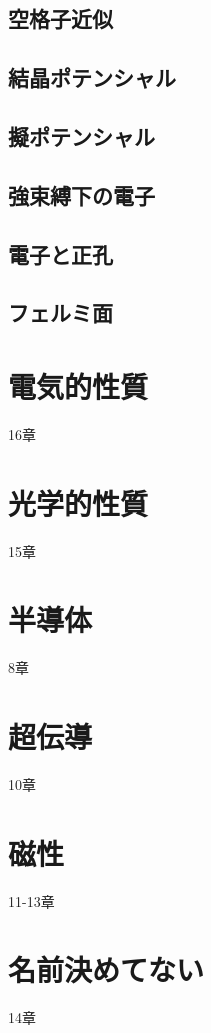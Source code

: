 \documentclass[a4paper]{jsreport}
\begin{document}
        \section{空格子近似}

        \section{結晶ポテンシャル}

        \section{擬ポテンシャル}

        \section{強束縛下の電子}

        \section{電子と正孔}

        \section{フェルミ面}

    \chapter{電気的性質}
        16章
    \chapter{光学的性質}
        15章
    \chapter{半導体}
        8章
    \chapter{超伝導}
        10章
    \chapter{磁性}
        11-13章
    \chapter{名前決めてない}
        14章
    
    
            
\end{document}
